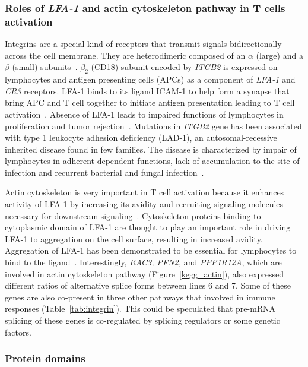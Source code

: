 \documentclass[10pt]{article}
\begin{document}
\subsubsection*{Roles of {\em LFA-1} and actin cytoskeleton pathway in T cells activation}

Integrins are a special kind of receptors that transmit signals bidirectionally
across the cell membrane.  They are heterodimeric composed of an $\alpha$
(large) and a $\beta$ (small) subunits~\cite{wang2010immunopathologies}.
$\beta_{2}$ (CD18) subunit encoded by {\em ITGB2} is expressed on lymphocytes
and antigen presenting cells (APCs) as a component of {\em LFA-1} and {\em CR3}
receptors.  LFA-1 binds to its ligand ICAM-1 to help form a synapse that bring
APC and T cell together to initiate antigen presentation leading to T cell
activation~\cite{dustin2000immunological}.  Absence of LFA-1 leads to impaired
functions of lymphocytes in proliferation and tumor
rejection~\cite{scharffetter1998spontaneous,schmits1996lfa}.  Mutations in {\em
ITGB2} gene has been associated with type 1 leukocyte adhesion deficiency
(LAD-1), an autosomal-recessive inherited disease found in few families.  The
disease is characterized by impair of lymphocytes in adherent-dependent
functions, lack of accumulation to the site of infection and recurrent bacterial
and fungal infection~\cite{springer1987lymphocyte}.

Actin cytoskeleton is very important in T cell activation because it enhances
activity of LFA-1 by increasing its avidity and recruiting signaling molecules
necessary for downstream signaling~\cite{dustin2000immunological,
van2000avidity}.  Cytoskeleton proteins binding to cytoplasmic domain of LFA-1
are thought to play an important role in driving LFA-1 to aggregation on the
cell surface, resulting in increased avidity.  Aggregation of LFA-1 has been
demonstrated to be essential for lymphocytes to bind to the
ligand~\cite{van1994extracellular}.  Interestingly, {\em RAC3, PFN2,} and {\em
PPP1R12A}, which are involved in actin cytoskeleton pathway
(Figure~\ref{kegg_actin}), also expressed different ratios of alternative splice
forms between lines 6 and 7.  Some of these genes are also co-present in three
other pathways that involved in immune responses (Table~\ref{tab:integrin}).
This could be speculated that pre-mRNA splicing of these genes is co-regulated
by splicing regulators or some genetic factors.

\subsubsection*{Protein domains}
\end{document}

